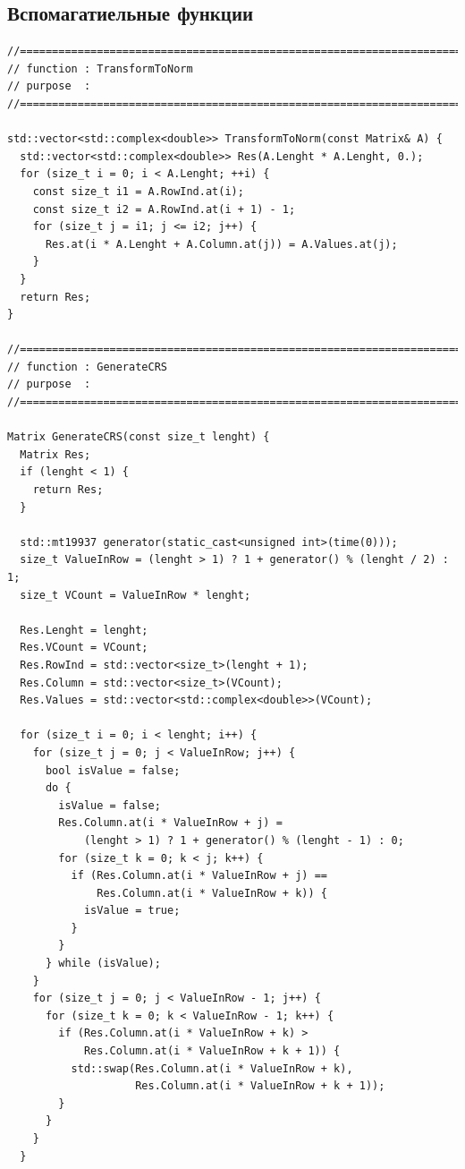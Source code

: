 \documentclass{report}
\begin{document}
\subsection*{Вспомагатиельные функции}
\begin{lstlisting}
//=======================================================================
// function : TransformToNorm
// purpose  :
//=======================================================================

std::vector<std::complex<double>> TransformToNorm(const Matrix& A) {
  std::vector<std::complex<double>> Res(A.Lenght * A.Lenght, 0.);
  for (size_t i = 0; i < A.Lenght; ++i) {
    const size_t i1 = A.RowInd.at(i);
    const size_t i2 = A.RowInd.at(i + 1) - 1;
    for (size_t j = i1; j <= i2; j++) {
      Res.at(i * A.Lenght + A.Column.at(j)) = A.Values.at(j);
    }
  }
  return Res;
}

//=======================================================================
// function : GenerateCRS
// purpose  :
//=======================================================================

Matrix GenerateCRS(const size_t lenght) {
  Matrix Res;
  if (lenght < 1) {
    return Res;
  }

  std::mt19937 generator(static_cast<unsigned int>(time(0)));
  size_t ValueInRow = (lenght > 1) ? 1 + generator() % (lenght / 2) : 1;
  size_t VCount = ValueInRow * lenght;

  Res.Lenght = lenght;
  Res.VCount = VCount;
  Res.RowInd = std::vector<size_t>(lenght + 1);
  Res.Column = std::vector<size_t>(VCount);
  Res.Values = std::vector<std::complex<double>>(VCount);

  for (size_t i = 0; i < lenght; i++) {
    for (size_t j = 0; j < ValueInRow; j++) {
      bool isValue = false;
      do {
        isValue = false;
        Res.Column.at(i * ValueInRow + j) =
            (lenght > 1) ? 1 + generator() % (lenght - 1) : 0;
        for (size_t k = 0; k < j; k++) {
          if (Res.Column.at(i * ValueInRow + j) ==
              Res.Column.at(i * ValueInRow + k)) {
            isValue = true;
          }
        }
      } while (isValue);
    }
    for (size_t j = 0; j < ValueInRow - 1; j++) {
      for (size_t k = 0; k < ValueInRow - 1; k++) {
        if (Res.Column.at(i * ValueInRow + k) >
            Res.Column.at(i * ValueInRow + k + 1)) {
          std::swap(Res.Column.at(i * ValueInRow + k),
                    Res.Column.at(i * ValueInRow + k + 1));
        }
      }
    }
  }


\end{lstlisting}
\end{document}
